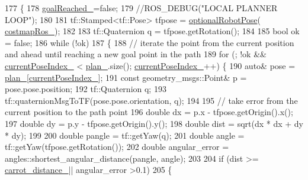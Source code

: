 \begin{DoxyCode}
177 \{
178     \hyperlink{classforward__local__planner_1_1ForwardLocalPlanner_a2041c1e8216fd7b6e9e00489fc463d4c}{goalReached\_}=\textcolor{keyword}{false};
179     \textcolor{comment}{//ROS\_DEBUG("LOCAL PLANNER LOOP");}
180 
181     tf::Stamped<tf::Pose> tfpose = \hyperlink{namespaceforward__local__planner_a0f2a0ed20a39ca20d24b83a5877bbb4d}{optionalRobotPose}(
      \hyperlink{classforward__local__planner_1_1ForwardLocalPlanner_a2c232a05866edf1b71003188a03fc0c5}{costmapRos\_});
182 
183     tf::Quaternion q = tfpose.getRotation();
184 
185     \textcolor{keywordtype}{bool} ok = \textcolor{keyword}{false};
186     \textcolor{keywordflow}{while} (!ok) 
187     \{
188         \textcolor{comment}{// iterate the point from the current position and ahead until reaching a new goal point in the
       path}
189         \textcolor{keywordflow}{for} (; !ok && \hyperlink{classforward__local__planner_1_1ForwardLocalPlanner_a38a9662e8603f91d372759331b152077}{currentPoseIndex\_} < \hyperlink{classforward__local__planner_1_1ForwardLocalPlanner_a64a6d7c51bafd57b02b9d098ac24dd45}{plan\_}.size(); 
      \hyperlink{classforward__local__planner_1_1ForwardLocalPlanner_a38a9662e8603f91d372759331b152077}{currentPoseIndex\_}++) \{
190             \textcolor{keyword}{auto}& pose = \hyperlink{classforward__local__planner_1_1ForwardLocalPlanner_a64a6d7c51bafd57b02b9d098ac24dd45}{plan\_}[\hyperlink{classforward__local__planner_1_1ForwardLocalPlanner_a38a9662e8603f91d372759331b152077}{currentPoseIndex\_}];
191             \textcolor{keyword}{const} geometry\_msgs::Point& p = pose.pose.position;
192             tf::Quaternion q;
193             tf::quaternionMsgToTF(pose.pose.orientation, q);
194 
195             \textcolor{comment}{// take error from the current position to the path point}
196             \textcolor{keywordtype}{double} dx = p.x - tfpose.getOrigin().x();
197             \textcolor{keywordtype}{double} dy = p.y - tfpose.getOrigin().y();
198             \textcolor{keywordtype}{double} dist = sqrt(dx * dx + dy * dy);
199 
200             \textcolor{keywordtype}{double} pangle = tf::getYaw(q);
201             \textcolor{keywordtype}{double} angle = tf::getYaw(tfpose.getRotation());
202             \textcolor{keywordtype}{double} angular\_error = angles::shortest\_angular\_distance(pangle, angle);
203 
204             \textcolor{keywordflow}{if} (dist >= \hyperlink{classforward__local__planner_1_1ForwardLocalPlanner_a1a40532dac9a9471ded4b0caac433c93}{carrot\_distance\_}|| angular\_error >0.1)  
205             \{

\end{DoxyCode}
